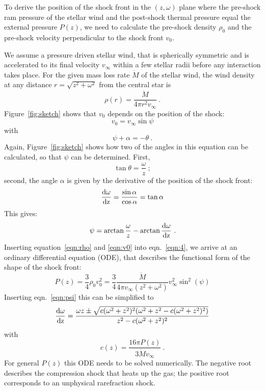To derive the position of the shock front in the $(z, \omega)$ plane where the pre-shock ram pressure of the stellar wind and the post-shock thermal pressure equal the external pressure $P(z)$, we need to calculate the pre-shock density $\rho_0$ and the pre-shock velocity perpendicular to the shock front $v_0$.

We assume a pressure driven stellar wind, that is spherically symmetric and is accelerated to its final velocity $v_{\infty}$ within a few stellar radii before any interaction takes place. For the given mass loss rate $\dot M$ of the stellar wind, the wind density at any distance $r=\sqrt{z^2+\omega^2}$ from the central star is 
\begin{equation}\label{eqn:rho}
\rho(r) = \frac{\dot M}{4 \pi r^2 v_{\infty}}\ .
\end{equation}
Figure~\ref{fig:sketch} shows that $v_0$ depends on the position of the shock:
\begin{equation}
\label{eqn:v0}v_0 = v_{\infty} \sin \psi
\end{equation}
with 
\begin{equation}\label{eqn:angle}
\psi+\alpha = - \theta \ .
\end{equation}
Again, Figure~\ref{fig:sketch} shows how two of the angles in this equation can be calculated, so that $\psi$ can be determined. First,
\begin{equation}\label{eqn:theta}
\tan\theta = \frac{\omega}{z}\ ;
\end{equation}
second, the angle $\alpha$ is given by the derivative of the position of the shock front:
\begin{equation}\label{eqn:deriv}
\frac{\rm{d}\omega}{\rm{d}z} = \frac{\sin \alpha}{\cos \alpha} = \tan{\alpha}
\end{equation}
This gives:
\begin{equation}\label{eqn:psi}
\psi = \arctan{\frac{\omega}{z}} - \arctan{\frac{\rm{d}\omega}{\rm{d}z}}\ .
\end{equation}
Inserting equation~\ref{eqn:rho} and \ref{eqn:v0} into eqn.~\ref{eqn:4}, we arrive at an ordinary differential equation (ODE), that describes the functional form of the shape of the shock front:
\begin{equation}
P(z) = \frac{3}{4}\rho_0v_0^2 = \frac{3}{4} \frac{\dot{M}}{4\pi v_{\infty}(z^2+\omega^2)} v_{\infty}^2 \sin^2(\psi)
\end{equation}
Inserting eqn.~\ref{eqn:psi} this can be simplified to
\begin{equation}\label{eqn:ode}
\frac{\rm{d}\omega}{\rm{d}z} = \frac{\omega z \pm \sqrt{c (\omega^2+z^2)^2 (\omega^2+z^2-c(\omega^2+z^2)^2)}}{z^2 - c(\omega^2+z^2)^2}
\end{equation}
with
\begin{equation}
c(z) = \frac{16\pi P(z)}{3 \dot{M} v_{\infty}}\ .
\end{equation}
For general $P(z)$ this ODE needs to be solved numerically. The negative root describes the compression shock that heats up the gas; the positive root corresponds to an unphysical rarefraction shock.